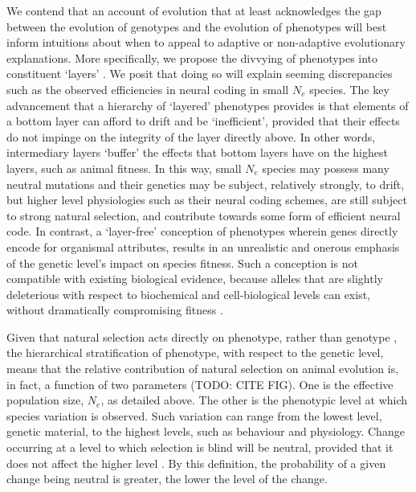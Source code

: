 \documentclass[twocolumn]{article}
\begin{document}
We contend that an account of evolution that at least acknowledges the gap between the evolution of genotypes and the evolution of phenotypes will best inform intuitions about when to appeal to adaptive or non-adaptive evolutionary explanations. More specifically, we propose the divvying of phenotypes into constituent `layers' \cite{Ho_Ohya_Zhang_2017, mayr_1997, wideman_doolittle_2019, Zhang_2018}. We posit that doing so will explain seeming discrepancies such as the observed efficiencies in neural coding in small $N_e$ species. The key advancement that a hierarchy of `layered' phenotypes provides is that elements of a bottom layer can afford to drift and be `inefficient', provided that their effects do not impinge on the integrity of the layer directly above. In other words, intermediary layers `buffer' the effects that bottom layers have on the highest layers, such as animal fitness. In this way, small $N_e$ species may possess many neutral mutations and their genetics may be subject, relatively strongly, to drift, but higher level physiologies such as their neural coding schemes, are still subject to strong natural selection, and contribute towards some form of efficient neural code. In contrast, a `layer-free' conception of phenotypes wherein genes directly encode for organismal attributes, results in an unrealistic and onerous emphasis of the genetic level's impact on species fitness. Such a conception is not compatible with existing biological evidence, because alleles that are slightly deleterious with respect to biochemical and cell-biological levels can exist, without dramatically compromising fitness \cite{wideman_doolittle_2019}. 

Given that natural selection acts directly on phenotype, rather than genotype \cite{mayr_1997}, the hierarchical stratification of phenotype, with respect to the genetic level, means that the relative contribution of natural selection on animal evolution is, in fact, a function of two parameters (TODO: CITE FIG). One is the effective population size, $N_e$, as detailed above. The other is the phenotypic level at which species variation is observed. Such variation can range from the lowest level, genetic material, to the highest levels, such as behaviour and physiology. Change occurring at a level to which selection is blind will be neutral, provided that it does not affect the higher level \cite{mayr_1997, wideman_doolittle_2019, Zhang_2018}. By this definition, the probability of a given change being neutral is greater, the lower the level of the change. 
\end{document}
